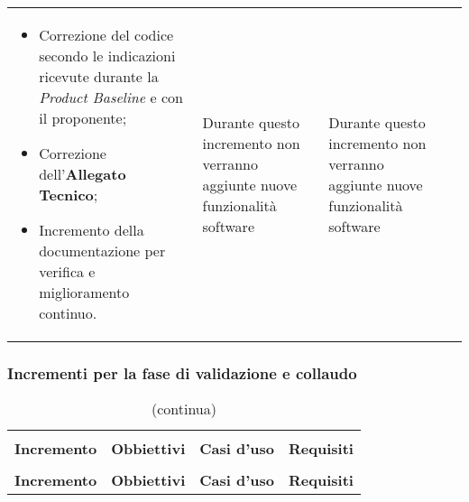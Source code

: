\begin{longtable}{
    >{\centering}p{}
    >{\raggedright}p{}
    >{\centering}p{}
    >{\centering}p{}
    }
\begin{itemize}
        \item Correzione del codice secondo le indicazioni ricevute durante la \textit{Product Baseline} e con il proponente;
        \item Correzione dell'\textbf{Allegato Tecnico};
        \item Incremento della documentazione per verifica e miglioramento continuo.
    \end{itemize}    & Durante questo incremento non verranno aggiunte nuove funzionalità software & Durante questo incremento non verranno aggiunte nuove funzionalità software
    \tabularnewline
\end{longtable}
\renewcommand{\arraystretch}{1}
\subsubsection{Incrementi per la fase di validazione e collaudo}
\renewcommand{\arraystretch}{1.5}
\begin{longtable}{
    >{\centering}p{}
    >{\raggedright}p{}
    >{\centering}p{}
    >{\centering}p{}
    }

    \caption{Tabella di tracciamento per la validazione}                                                                         \\
    \rowcolor{white}                                                                                                             \\
    \rowcolor{logo!70}
    \centering\textbf{Incremento} & \centering\textbf{Obbiettivi} & \centering\textbf{Casi d'uso} & \centering\textbf{Requisiti}
    \tabularnewline
    \endfirsthead
    \rowcolor{white}\caption[]{(continua)}                                                                                       \\
    \rowcolor{logo!70}
    \centering\textbf{Incremento} & \centering\textbf{Obbiettivi} & \centering\textbf{Casi d'uso} & \centering\textbf{Requisiti}
    \tabularnewline
    \endhead
\end{longtable}
\renewcommand{\arraystretch}{1}